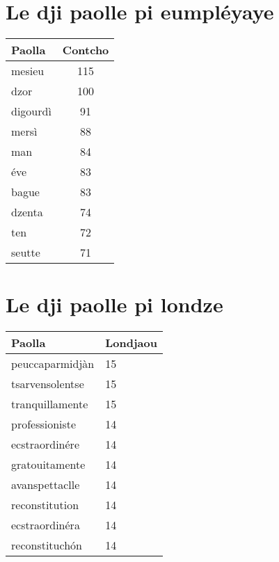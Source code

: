 \section*{Le dji paolle pi eumpléyaye}
\begin{tabular}{lc}
\toprule
\textbf{Paolla} & \textbf{Contcho} \\
\midrule
mesieu & 115 \\
dzor & 100 \\
digourdì & 91 \\
mersì & 88 \\
man & 84 \\
éve & 83 \\
bague & 83 \\
dzenta & 74 \\
ten & 72 \\
seutte & 71 \\
\bottomrule
\end{tabular}


\section*{Le dji paolle pi londze}
\begin{tabular}{ll}
\toprule
\textbf{Paolla} & \textbf{Londjaou} \\
\midrule
peuccaparmidjàn & 15 \\
tsarvensolentse & 15 \\
tranquillamente & 15 \\
professioniste & 14 \\
ecstraordinére & 14 \\
gratouitamente & 14 \\
avanspettaclle & 14 \\
reconstitution & 14 \\
ecstraordinéra & 14 \\
reconstituchón & 14 \\
\bottomrule
\end{tabular}
